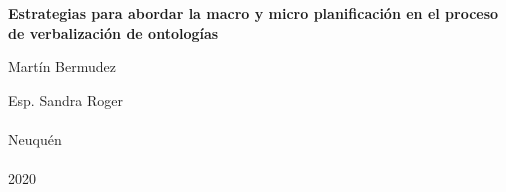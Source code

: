 \begin{center}

{\LARGE {\bf Estrategias para abordar la macro y micro planificación en el proceso de verbalización de ontologías }}\\


\vspace{3cm}




{\Large Martín Bermudez}\\
\vspace{2cm}

{\Large Esp. Sandra Roger}\\
\ \\

\vfill
{\Large {\sc Neuquén}\hspace{6cm}{\sc Argentina}}\\
\ \\

{\Large 2020}\\

\end{center}

\pagebreak

